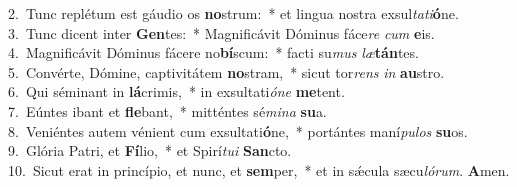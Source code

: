 {2.~}Tunc replétum est gáudio os \textbf{no}strum:~* et lingua nostra exsul\textit{ta}\textit{ti}\textbf{ó}ne.\\
{3.~}Tunc dicent inter \textbf{Gen}tes:~* Magnificávit Dóminus fáce\textit{re} \textit{cum} \textbf{e}is.\\
{4.~}Magnificávit Dóminus fácere no\textbf{bí}scum:~* facti su\textit{mus} \textit{læ}\textbf{tán}tes.\\
{5.~}Convérte, Dómine, captivitátem \textbf{no}stram,~* sicut tor\textit{rens} \textit{in} \textbf{au}stro.\\
{6.~}Qui séminant in \textbf{lá}crimis,~* in exsultati\textit{ó}\textit{ne} \textbf{me}tent.\\
{7.~}Eúntes ibant et \textbf{fle}bant,~* mitténtes sé\textit{mi}\textit{na} \textbf{su}a.\\
{8.~}Veniéntes autem vénient cum exsultati\textbf{ó}ne,~* portántes maní\textit{pu}\textit{los} \textbf{su}os.\\
{9.~}Glória Patri, et \textbf{Fí}lio,~* et Spirí\textit{tu}\textit{i} \textbf{San}cto.\\
{10.~}Sicut erat in princípio, et nunc, et \textbf{sem}per,~* et in sǽcula sæcu\textit{ló}\textit{rum}. \textbf{A}men.\\
